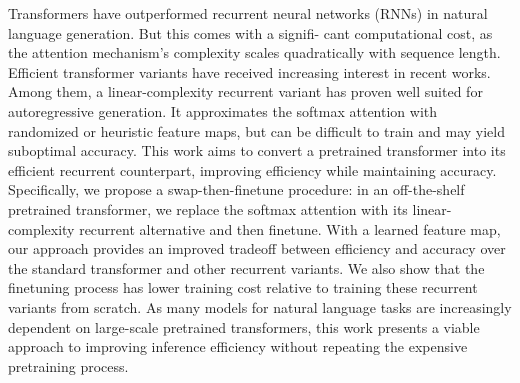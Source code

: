 Transformers have outperformed recurrent neural networks (RNNs) in natural language generation. But this comes with a signifi- cant computational cost, as the attention mechanism's complexity scales quadratically with sequence length. Efficient transformer variants have received increasing interest in recent works. Among them, a linear-complexity recurrent variant has proven well suited for autoregressive generation. It approximates the softmax attention with randomized or heuristic feature maps, but can be difficult to train and may yield suboptimal accuracy. This work aims to convert a pretrained transformer into its efficient recurrent counterpart, improving efficiency while maintaining accuracy. Specifically, we propose a swap-then-finetune procedure: in an off-the-shelf pretrained transformer, we replace the softmax attention with its linear-complexity recurrent alternative and then finetune. With a learned feature map, our approach provides an improved tradeoff between efficiency and accuracy over the standard transformer and other recurrent variants. We also show that the finetuning process has lower training cost relative to training these recurrent variants from scratch. As many models for natural language tasks are increasingly dependent on large-scale pretrained transformers, this work presents a viable approach to improving inference efficiency without repeating the expensive pretraining process.
